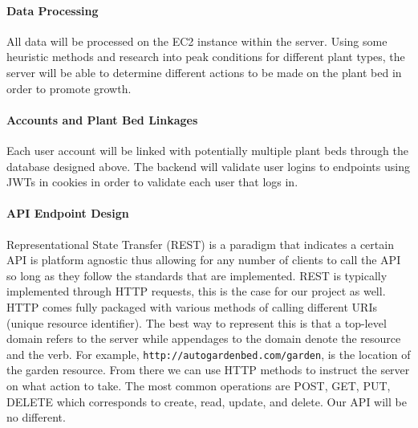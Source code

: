 \paragraph{Data Processing}
All data will be processed on the EC2 instance within the server. Using some heuristic methods and research into peak conditions for different plant types, the server will be able to determine different actions to be made on the plant bed in order to promote growth.
\paragraph{Accounts and Plant Bed Linkages}
Each user account will be linked with potentially multiple plant beds through the database designed above. The backend will validate user logins to endpoints using JWTs in cookies in order to validate each user that logs in.
\paragraph{API Endpoint Design}
Representational State Transfer (REST) is a paradigm that indicates a certain API is platform agnostic thus allowing for any number of clients to call the API so long as they follow the standards that are implemented. REST is typically implemented through HTTP requests, this is the case for our project as well. HTTP comes fully packaged with various methods of calling different URIs (unique resource identifier). The best way to represent this is that a top-level domain refers to the server while appendages to the domain denote the resource and the verb. For example, \verb|http://autogardenbed.com/garden|, is the location of the garden resource. From there we can use HTTP methods to instruct the server on what action to take. The most common operations are POST, GET, PUT, DELETE which corresponds to create, read, update, and delete. Our API will be no different.

